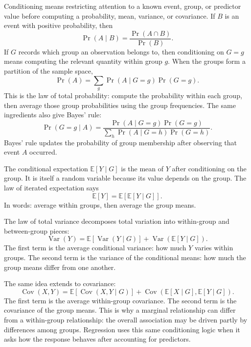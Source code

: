 {Conditioning means restricting attention to a known event, group, or predictor value before computing a probability, mean, variance, or covariance.  If \(B\) is an event with positive probability, then
\begin{equation}
  \Pr(A\mid B)=\frac{\Pr(A\cap B)}{\Pr(B)}.
  \label{eq:conditional-probability}
\end{equation}
If \(G\) records which group an observation belongs to, then conditioning on \(G=g\) means computing the relevant quantity within group \(g\).  When the groups form a partition of the sample space,
\begin{equation}
  \Pr(A)=\sum_g \Pr(A\mid G=g)\Pr(G=g).
  \label{eq:total-probability}
\end{equation}
This is the law of total probability: compute the probability within each group, then average those group probabilities using the group frequencies.  The same ingredients also give Bayes' rule:
\begin{equation}
  \Pr(G=g\mid A)
  =
  \frac{\Pr(A\mid G=g)\Pr(G=g)}
       {\sum_h \Pr(A\mid G=h)\Pr(G=h)}.
  \label{eq:bayes-rule-partition}
\end{equation}
Bayes' rule updates the probability of group membership after observing that event \(A\) occurred.

The conditional expectation \(\mathbb{E}[Y\mid G]\) is the mean of \(Y\) after conditioning on the group.  It is itself a random variable because its value depends on the group.  The law of iterated expectation says
\begin{equation}
  \mathbb{E}[Y]=\mathbb{E}\!\left[\mathbb{E}[Y\mid G]\right].
  \label{eq:law-iterated-expectation}
\end{equation}
In words: average within groups, then average the group means.

The law of total variance decomposes total variation into within-group and between-group pieces:
\begin{equation}
  \operatorname{Var}(Y)
  =
  \mathbb{E}\!\left[\operatorname{Var}(Y\mid G)\right]
  +
  \operatorname{Var}\!\left(\mathbb{E}[Y\mid G]\right).
  \label{eq:law-total-variance}
\end{equation}
The first term is the average conditional variance: how much \(Y\) varies within groups.  The second term is the variance of the conditional means: how much the group means differ from one another.

The same idea extends to covariance:
\begin{equation}
  \operatorname{Cov}(X,Y)
  =
  \mathbb{E}\!\left[\operatorname{Cov}(X,Y\mid G)\right]
  +
  \operatorname{Cov}\!\left(\mathbb{E}[X\mid G],\mathbb{E}[Y\mid G]\right).
  \label{eq:law-total-covariance}
\end{equation}
The first term is the average within-group covariance.  The second term is the covariance of the group means.  This is why a marginal relationship can differ from a within-group relationship: the overall association may be driven partly by differences among groups.  Regression uses this same conditioning logic when it asks how the response behaves after accounting for predictors.

}
